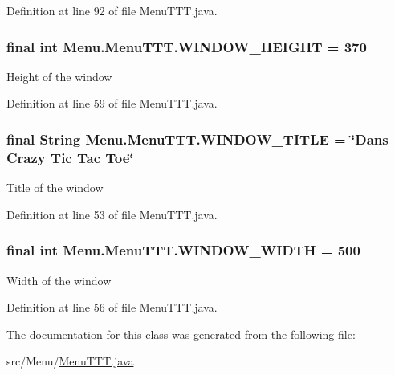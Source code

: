 Definition at line 92 of file Menu\+T\+T\+T.\+java.

\hypertarget{class_menu_1_1_menu_t_t_t_a5f9a3dacb45dd6f4f1749aa86d1b1154}{}
\subsubsection[{W\+I\+N\+D\+O\+W\+\_\+\+H\+E\+I\+G\+H\+T}]{\setlength{\rightskip}{0pt plus 5cm}final int Menu.\+Menu\+T\+T\+T.\+W\+I\+N\+D\+O\+W\+\_\+\+H\+E\+I\+G\+H\+T = 370\hspace{0.3cm}{\ttfamily [private]}}\label{class_menu_1_1_menu_t_t_t_a5f9a3dacb45dd6f4f1749aa86d1b1154}
Height of the window 

Definition at line 59 of file Menu\+T\+T\+T.\+java.

\hypertarget{class_menu_1_1_menu_t_t_t_a415b411bb82c4159d053e2e3a87a9061}{}
\subsubsection[{W\+I\+N\+D\+O\+W\+\_\+\+T\+I\+T\+L\+E}]{\setlength{\rightskip}{0pt plus 5cm}final String Menu.\+Menu\+T\+T\+T.\+W\+I\+N\+D\+O\+W\+\_\+\+T\+I\+T\+L\+E = \char`\"{}Dans Crazy Tic Tac Toe\char`\"{}\hspace{0.3cm}{\ttfamily [private]}}\label{class_menu_1_1_menu_t_t_t_a415b411bb82c4159d053e2e3a87a9061}
Title of the window 

Definition at line 53 of file Menu\+T\+T\+T.\+java.

\hypertarget{class_menu_1_1_menu_t_t_t_a07f18d5ed40cd020290f7cb16ffadca8}{}
\subsubsection[{W\+I\+N\+D\+O\+W\+\_\+\+W\+I\+D\+T\+H}]{\setlength{\rightskip}{0pt plus 5cm}final int Menu.\+Menu\+T\+T\+T.\+W\+I\+N\+D\+O\+W\+\_\+\+W\+I\+D\+T\+H = 500\hspace{0.3cm}{\ttfamily [private]}}\label{class_menu_1_1_menu_t_t_t_a07f18d5ed40cd020290f7cb16ffadca8}
Width of the window 

Definition at line 56 of file Menu\+T\+T\+T.\+java.



The documentation for this class was generated from the following file\+:\begin{DoxyCompactItemize}
\item 
src/\+Menu/\hyperlink{_menu_t_t_t_8java}{Menu\+T\+T\+T.\+java}\end{DoxyCompactItemize}

